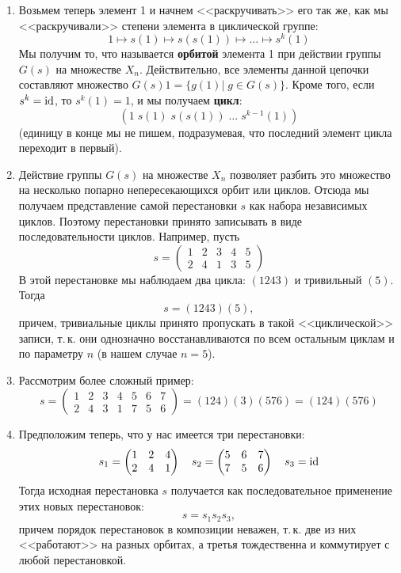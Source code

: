 \begin{enumerate}
\item Возьмем теперь элемент 1 и начнем <<раскручивать>> его так же, как мы <<раскручивали>> степени элемента в циклической группе:
$$
1\mapsto s(1)\mapsto s(s(1))\mapsto\dots\mapsto s^k(1)
$$
Мы получим то, что называется \textbf{орбитой} элемента 1 при действии группы $G(s)$ на множестве $X_n$. Действительно, все элементы данной цепочки составляют множество $G(s)1=\{g(1)|\;g\in G(s)\}$. Кроме того, если $s^k=\mathrm{id}$, то $s^k(1)=1$, и мы получаем \textbf{цикл}:
$$
(1\; s(1)\; s(s(1))\;\dots\; s^{k-1}(1))
$$
(единицу в конце мы не пишем, подразумевая, что последний элемент цикла переходит в первый).

\item Действие группы $G(s)$ на множестве $X_n$ позволяет разбить это множество на несколько попарно непересекающихся орбит или циклов. Отсюда мы получаем представление самой перестановки $s$ как набора независимых циклов. Поэтому перестановки принято записывать в виде последовательности циклов. Например, пусть
$$
s=
\begin{pmatrix}
1 & 2 & 3 & 4 & 5 \\
2 & 4 & 1 & 3 & 5
\end{pmatrix}
$$
В этой перестановке мы наблюдаем два цикла: $(1 2 4 3)$ и тривильный $(5)$. Тогда
$$
s=(1 2 4 3)(5),
$$
причем, тривиальные циклы принято пропускать в такой <<циклической>> записи, т.\,к. они однозначно восстанавливаются по всем остальным циклам и по параметру $n$ (в нашем случае $n=5$).
\item Рассмотрим более сложный пример:
$$
s=
\begin{pmatrix}
1 & 2 & 3 & 4 & 5 & 6 & 7 \\
2 & 4 & 3 & 1 & 7 & 5 & 6
\end{pmatrix}
=(1 2 4)(3)(5 7 6)=(1 2 4)(5 7 6)
$$

\item Предположим теперь, что у нас имеется три перестановки:
$$
s_1=
\begin{pmatrix}
1 & 2 & 4 \\
2 & 4 & 1
\end{pmatrix}
\quad s_2=
\begin{pmatrix}
5 & 6 & 7 \\
7 & 5 & 6
\end{pmatrix}
\quad s_3=\mathrm{id}
$$
Тогда исходная перестановка $s$ получается как последовательное применение этих новых перестановок:
$$
s=s_1s_2s_3,
$$
причем порядок перестановок в композиции неважен, т.\,к. две из них <<работают>> на разных орбитах, а третья тождественна и коммутирует с любой перестановкой.


\end{enumerate}
